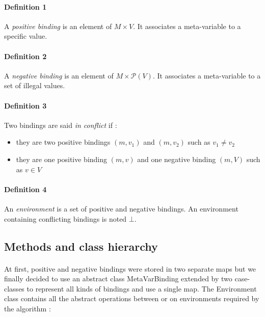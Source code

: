 \documentclass{report}
\begin{document}
\paragraph{Definition 1}
A \textit{positive binding} is an element of $M \times V$. It associates a meta-variable to a specific value.

\paragraph{Definition 2}
A \textit{negative binding} is an element of $M \times \mathscr{P}(V)$. It associates a meta-variable to a set of illegal values.

\paragraph{Definition 3}
Two bindings are said \textit{in conflict} if :

\vspace{1.5mm}
\begin{itemize}
\item they are two positive bindings $(m,v_1)$ and $(m,v_2)$ such as $v_1 \neq v_2$\vspace{1mm}
\item they are one positive binding $(m,v)$ and one negative binding $(m,V)$ such as
$v \in V$\vspace{1mm}
\end{itemize}

\paragraph{Definition 4}
An \textit{environment} is a set of positive and negative bindings.  An environment 
containing conflicting bindings is noted $\bot$.

\subsection{Methods and class hierarchy}

\paragraph{}
\hspace{4mm}At first, positive and negative bindings were stored in two separate maps but we finally decided 
to use an abstract class MetaVarBinding extended by two case-classes to represent all kinds of bindings and use a single map.
The Environment class contains all the abstract operations between or on environments required by the algorithm :
\end{document}
